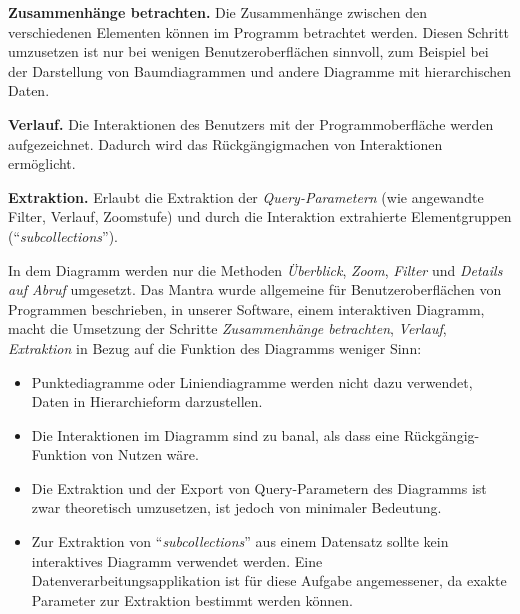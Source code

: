 \textbf{Zusammenhänge betrachten.} Die Zusammenhänge zwischen den verschiedenen Elementen können im Programm betrachtet werden. Diesen Schritt umzusetzen ist nur bei wenigen Benutzeroberflächen sinnvoll, zum Beispiel bei der Darstellung von Baumdiagrammen und andere Diagramme mit hierarchischen Daten.

\textbf{Verlauf.} Die Interaktionen des Benutzers mit der Programmoberfläche werden aufgezeichnet. Dadurch wird das Rückgängigmachen von Interaktionen ermöglicht.

\textbf{Extraktion.} Erlaubt die Extraktion der \textit{Query-Parametern} (wie angewandte Filter, Verlauf, Zoomstufe) und durch die Interaktion extrahierte Elementgruppen ("`\textit{subcollections}"').

In dem Diagramm werden nur die Methoden \textit{Überblick}, \textit{Zoom}, \textit{Filter} und \textit{Details auf Abruf} umgesetzt. Das Mantra wurde allgemeine für Benutzeroberflächen von Programmen beschrieben, in unserer Software, einem interaktiven Diagramm, macht die Umsetzung der Schritte \textit{Zusammenhänge betrachten}, \textit{Verlauf}, \textit{Extraktion} in Bezug auf die Funktion des Diagramms weniger Sinn:

\begin{itemize}
	\item Punktediagramme oder Liniendiagramme werden nicht dazu verwendet, Daten in Hierarchieform darzustellen.
	\item Die Interaktionen im Diagramm sind zu banal, als dass eine Rückgängig-Funktion von Nutzen wäre.
	\item Die Extraktion und der Export von Query-Parametern des Diagramms ist zwar theoretisch umzusetzen, ist jedoch von minimaler Bedeutung.
	\item Zur Extraktion von "`\textit{subcollections}"' aus einem Datensatz sollte kein interaktives Diagramm verwendet werden. Eine Datenverarbeitungsapplikation ist für diese Aufgabe angemessener, da exakte Parameter zur Extraktion bestimmt werden können.
\end{itemize}

